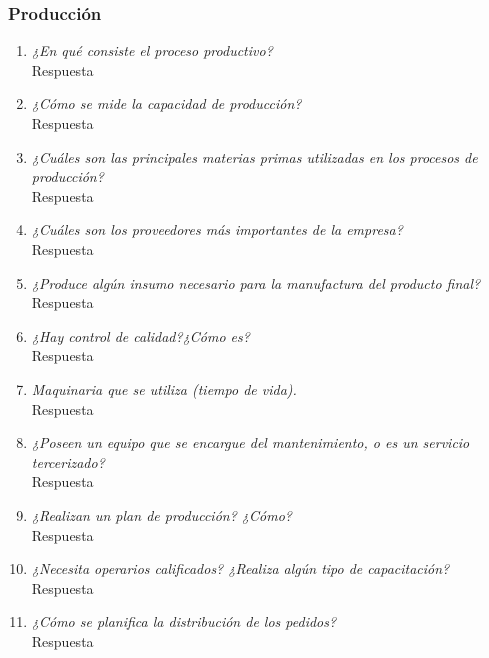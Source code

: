 \documentclass[a4paper,10pt]{article}
\begin{document}
		\subsubsection{Producción}
			\begin{enumerate}[resume]
				\item \textit{¿En qué consiste el proceso productivo?}\\
				
				Respuesta
				
				\item \textit{¿Cómo se mide la capacidad de producción?}\\
				
				Respuesta
				
				\item \textit{¿Cuáles son las principales materias primas utilizadas en los procesos de producción?}\\
				
				Respuesta
				
				\item \textit{¿Cuáles son los proveedores más importantes de la empresa?}\\
				
				Respuesta
				
				\item \textit{¿Produce algún insumo necesario para la manufactura del producto final?}\\
				
				Respuesta
				
				\item \textit{¿Hay control de calidad?¿Cómo es?}\\
								
				Respuesta
				
				\item \textit{Maquinaria que se utiliza (tiempo de vida).}\\
				
				Respuesta
				
				\item \textit{¿Poseen un equipo que se encargue del mantenimiento, o es un servicio tercerizado?}\\
				
				Respuesta
				
				\item \textit{¿Realizan un plan de producción? ¿Cómo?}\\
				
				Respuesta
				
				\item \textit{¿Necesita operarios calificados? ¿Realiza algún tipo de capacitación?}\\
				
				Respuesta
				
				\item \textit{¿Cómo se planifica la distribución de los pedidos?}\\
				
				Respuesta
				
				
			
			\end{enumerate}
			
\end{document}
